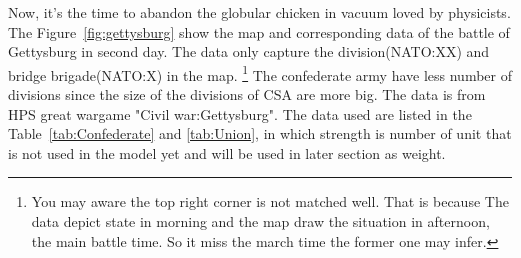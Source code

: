 \documentclass{article}
\begin{document}
Now, it's the time to abandon the globular chicken in vacuum loved by physicists.
The Figure~\ref{fig:gettysburg} show the map and corresponding data of the battle of Gettysburg in second day.
The data only capture the division(NATO:XX) and bridge brigade(NATO:X) in the map.
\footnote{You may aware the top right corner is not matched well. 
That is because The data depict state in morning and the map draw the situation in afternoon, the main battle time.
So it miss the march time the former one may infer.}
The confederate army have less number of divisions since the size of the divisions of CSA are more big.
The data is from HPS great wargame "Civil war:Gettysburg". 
The data used are listed in the Table~\ref{tab:Confederate} and \ref{tab:Union}, in which strength 
is number of unit that is not used in the model yet and will be used in later section as weight.
\end{document}
